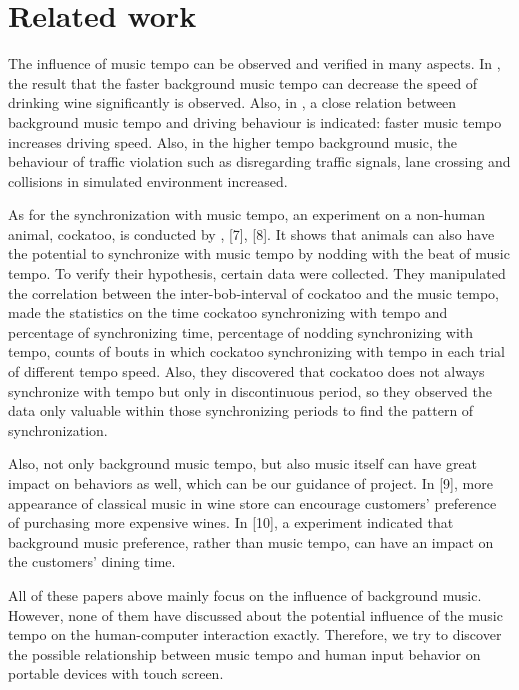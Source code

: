 \section{Related work}

The influence of music tempo can be observed and verified in many aspects. In \cite{mcelrea:drinking}, the result that the faster background music tempo can decrease the speed of drinking wine significantly is observed. Also, in \cite{patel:avian}, a close relation between background music tempo and driving behaviour is indicated: faster music tempo increases driving speed. Also, in the higher tempo background music, the behaviour of traffic violation such as disregarding traffic signals, lane crossing and collisions in simulated environment increased. 

As for the synchronization with music tempo, an experiment on a non-human animal, cockatoo, is conducted by \cite{patel:non-human}, [7], [8]. It shows that animals can also have the potential to synchronize with music tempo by nodding with the beat of music tempo. To verify their hypothesis, certain data were collected. They manipulated the correlation between the inter-bob-interval of cockatoo and the music tempo, made the statistics on the time cockatoo synchronizing with tempo and percentage of synchronizing time, percentage of nodding synchronizing with tempo, counts of bouts in which cockatoo synchronizing with tempo in each trial of different tempo speed. Also, they discovered that cockatoo does not always synchronize with tempo but only in discontinuous period, so they observed the data only valuable within those synchronizing periods to find the pattern of synchronization.

Also, not only background music tempo, but also music itself can have great impact on behaviors as well, which can be our guidance of project. In [9], more appearance of classical music in wine store can encourage customers' preference of purchasing more expensive wines. In [10], a experiment indicated that background music preference, rather than music tempo, can have an impact on the customers' dining time. 

All of these papers above mainly focus on the influence of background music. However, none of them have discussed about the potential influence of the music tempo on the human-computer interaction exactly. Therefore, we try to discover the possible relationship between music tempo and human input behavior on portable devices with touch screen.
